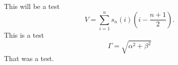 \documentclass[11pt]{book}
\begin{document}
\noindent This will be a test
\begin{equation}
V = \sum_{i=1}^{n} s_n(i) \left( i - \frac{n+1}{2} \right).
\end{equation}
This is a test
\begin{equation}
\Gamma = \sqrt{\alpha^2+\beta^2}
\end{equation}
That was a test.
\end{document}
